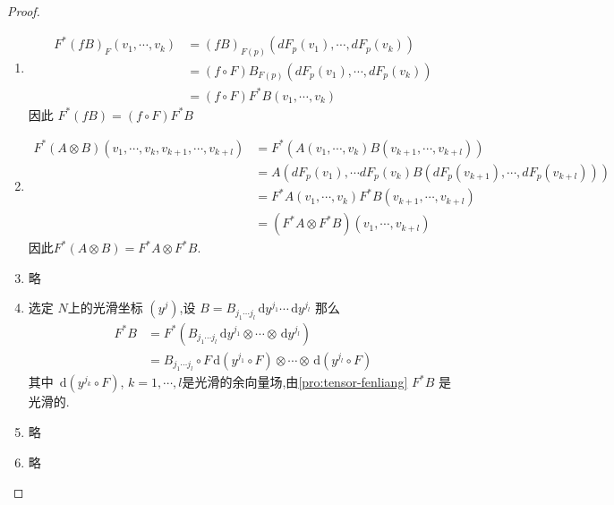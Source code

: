 \documentclass[../../几何与拓扑.tex]{subfiles}
\begin{document}
\begin{proof}
    \begin{enumerate}
        \item  $$
        \begin{aligned}
        F^{*}\left( fB \right)_{F}\left( v_1,\cdots ,v_{k} \right) & = \left( fB \right)_{F\left( p \right) }\left( dF _{p}\left( v_1 \right),\cdots ,dF _{p}\left( v_{k} \right)   \right)\\ 
         & =      \left( f\circ F \right) B_{F\left( p \right) } \left( dF _{p}\left( v_1 \right),\cdots ,dF _{p}\left( v_{k} \right)   \right)\\ 
          & = \left( f\circ F \right)F^{*}B\left( v_1,\cdots ,v_{k} \right)    
        \end{aligned}
        $$因此 $ F^{*}\left( fB \right)=\left( f\circ F  \right)F ^{*}B   $ 

        \item $$
    \begin{aligned}
    F^{*}\left( A\otimes B \right)\left( v_1,\cdots ,v_{k},v_{k+ 1},\cdots ,v_{k+ l} \right)   & = 
    F^{*}\left( A\left( v_1,\cdots ,v_{k} \right)B\left( v_{k+ 1},\cdots ,v_{k+ l} \right)   \right)\\ 
     & = A\left( dF _{p}\left( v_1 \right),\cdots dF _{p}\left( v_{k} \right)B\left( dF _{p}\left( v_{k+ 1} \right),\cdots ,dF _{p}\left( v_{k+ l} \right)   \right)    \right) \\ 
       & = F^{*}A\left( v_1,\cdots ,v_{k} \right)F^{*}B\left( v_{k+ 1},\cdots ,v_{k+ l} \right)\\ 
        & = \left( F^{*}A\otimes F^{*}B \right)\left( v_1,\cdots ,v_{k+ l} \right)    
    \end{aligned}$$因此$F^{*}\left( A\otimes B \right)= F^{*}A\otimes F^{*}B$.
    \item 略
    \item 选定 $ N $上的光滑坐标 $ \left( y^{j} \right)  $,设 $ B= B_{j_1\cdots j_{l}} \,\mathrm{d} y^{j_1} \cdots \,\mathrm{d} y^{j_{l} }$ 
    那么 $$
  \begin{aligned}
    F^{*}B &= F^{*}\left( B_{j_1\cdots j_{l}}\,\mathrm{d} y^{j_1}\otimes \cdots\otimes  \,\mathrm{d} y^{j_{l}} \right) \\ 
     & = B_{j_1\cdots j_{l}}\circ F \,\mathrm{d} \left( y^{j_1}\circ F \right)\otimes \cdots \otimes   \,\mathrm{d} \left( y^{j_{l}}\circ F \right) 
  \end{aligned}$$其中 $ \,\mathrm{d} \left( y^{j_{k}}\circ F \right)  $, $  k=1,\cdots ,l $是光滑的余向量场,由\ref{pro:tensor-fenliang} $ F^{*}B $ 是光滑的.
  \item 略
  \item 略
    \end{enumerate}
\end{proof}
\end{document}
